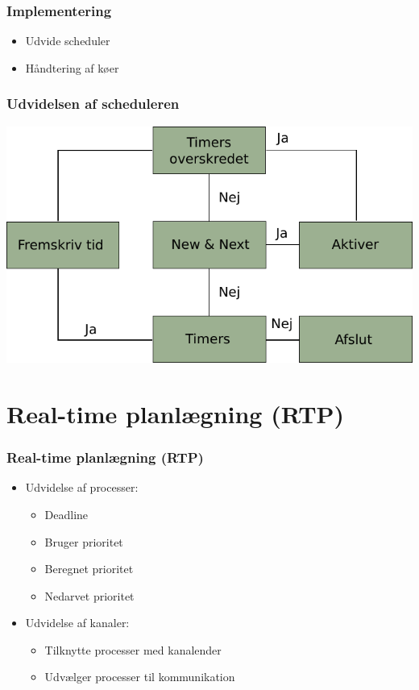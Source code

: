 \documentclass[12pt]{beamer}
\begin{document}
\begin{frame}
\frametitle{Implementering}
  \begin{itemize}   
	\item Udvide scheduler
	\item Håndtering af køer
  \end{itemize}
\end{frame}
 
\begin{frame}
\frametitle{Udvidelsen af scheduleren}
\includegraphics[scale=0.9]{des-scheduler} 
\end{frame}


\section{Real-time planlægning (RTP)}
\begin{frame}
  \frametitle{Real-time planlægning (RTP)}
  \begin{itemize}
	\item Udvidelse af processer:
	  \begin{itemize}   
		\item Deadline
		\item Bruger prioritet
		\item Beregnet prioritet	
		\item Nedarvet prioritet
	  \end{itemize}
	\item Udvidelse af kanaler:
	  \begin{itemize}   
		\item Tilknytte processer med kanalender
		\item Udvælger processer til kommunikation
	  \end{itemize}
\end{itemize}
\end{frame}
\end{document}
